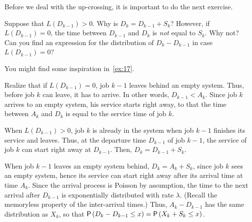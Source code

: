 Before we deal with the up-crossing, it is important to do the next exercise.
\begin{exercise}
 Suppose that $L(D_{k-1})>0$.
 Why is $D_k = D_{k-1} + S_{k}$?
 However, if $L(D_{k-1}) = 0$, the time between $D_{k-1}$ and $D_k$ is \emph{not} equal to $S_k$.
 Why not?
 Can you find an expression for the distribution of $D_k-D_{k-1}$ in case $L(D_{k-1})=0$?
\begin{hint}
 You might find some inspiration in~\cref{ex:17}.

 Realize that if $L(D_{k-1})=0$, job $k-1$ leaves behind an empty system.
 Thus, before job $k$ can leave, it has to arrive.
 In other words, $D_{k-1}<A_k$.
 Since job $k$ arrives to an empty system, his service starts right away, to that the time between $A_k$ and $D_k$ is equal to the service time of job $k$.
\end{hint}
\begin{solution}
 When $L(D_{k-1})>0$, job $k$ is already in the system when job $k-1$
 finishes its service and leaves. Thus, at the departure time
 $D_{k-1}$ of job $k-1$, the service of job $k$ can start right away
 at $D_{k-1}$. Then, $D_k=D_{k-1}+S_k$.


 When job $k-1$ leaves an empty system behind, $D_k= A_k + S_k$,
 since job $k$ sees an empty system, hence its service can start
 right away after its arrival time at time $A_k$. Since the arrival
 process is Poisson by assumption, the time to the next arrival
 after $D_{k-1}$ is exponentially distributed with rate
 $\lambda$. (Recall the memoryless property of the inter-arrival
 times.) Thus, $A_k - D_{k-1}$ has the same distribution as $X_k$,
 so that $\P{D_k - D_{k-1} \leq x} = \P{X_k + S_k\leq x}$. 
\end{solution}
\end{exercise}


